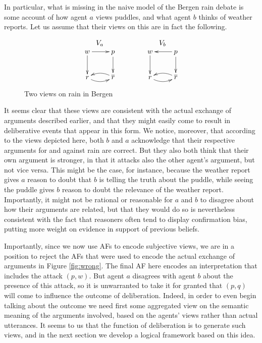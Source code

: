 \documentclass[greybox]{svmult}
\renewcommand{\bar}[1]{\overline{#1}}
\begin{document}
In particular, what is missing in the naive model of the Bergen rain debate is some account of how agent $a$ views puddles, and what agent $b$ thinks of weather reports. Let us assume that their views on this are in fact the following.
\begin{figure}
$$\begin{array}{cc}
V_{a} \hspace{3em} & V_{b} \\
\xymatrix{ w \ar[d] \ar[r] & p \ar[d] \\ r \ar@/_/[r] & \bar r \ar@/_/[l] } \hspace{3em} &
\xymatrix{w \ar[d] & p \ar[d] \ar[l] \\ r \ar@/_/[r] & \bar r \ar@/_/[l] }
\end{array}$$
\caption{Two views on rain in Bergen}
\label{rainview}
\end{figure}
It seems clear that these views are consistent with the actual exchange of arguments described earlier, and that they might easily come to result in deliberative events that appear in this form. We notice, moreover, that according to the views depicted here, both $b$ and $a$ acknowledge that their respective arguments for and against rain are correct. But they also both think that their own argument is stronger, in that it attacks also the other agent's argument, but not vice versa. This might be the case, for instance, because the weather report gives $a$ reason to doubt that $b$ is telling the truth about the puddle, while seeing the puddle gives $b$ reason to doubt the relevance of the weather report. Importantly, it might not be rational or reasonable for $a$ and $b$ to disagree about how their arguments are related, but that they would do so is nevertheless consistent with the fact that reasoners often tend to display confirmation bias, putting more weight on evidence in support of previous beliefs.

Importantly, since we now use AFs to encode subjective views, we are in a position to reject the AFs that were used to encode the actual exchange of arguments in Figure \ref{fig:wrong}. The final AF here encodes an interpretation that includes the attack $(p,w)$. But agent $a$ disagrees with agent $b$ about the presence of this attack, so it is unwarranted to take it for granted that $(p,q)$ will come to influence the outcome of deliberation. Indeed, in order to even begin talking about the outcome we need first some aggregated view on the semantic meaning of the arguments involved, based on the agents' views rather than actual utterances. It seems to us that the function of deliberation is to generate such views, and in the next section we develop a logical framework based on this idea.
\end{document}
